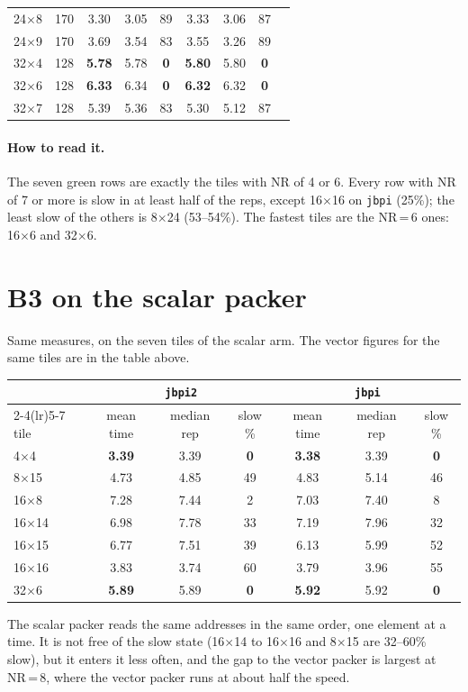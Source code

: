 \documentclass[10pt,a4paper]{article}
\newcommand{\up}[1]{\textcolor{red!70!black}{#1}}
\newcommand{\good}[1]{\textcolor{green!45!black}{\textbf{#1}}}
\begin{document}
\begin{center}
\begin{tabular}{@{}lcccccccc@{}}
24$\times$8 & 170 & 3.30 & 3.05 & \up{89} & 3.33 & 3.06 & \up{87} \\
24$\times$9 & 170 & 3.69 & 3.54 & \up{83} & 3.55 & 3.26 & \up{89} \\
32$\times$4 & 128 & \good{5.78} & 5.78 & \good{0} & \good{5.80} & 5.80 & \good{0} \\
32$\times$6 & 128 & \good{6.33} & 6.34 & \good{0} & \good{6.32} & 6.32 & \good{0} \\
32$\times$7 & 128 & 5.39 & 5.36 & \up{83} & 5.30 & 5.12 & \up{87} \\
\bottomrule
\end{tabular}
\end{center}

\paragraph{How to read it.} The seven green rows are exactly the tiles with NR of 4 or 6. Every row with NR of 7 or
more is slow in at least half of the reps, except 16$\times$16 on \texttt{jbpi} (25\%); the least slow of the others
is 8$\times$24 (53--54\%). The fastest tiles are the NR\,=\,6 ones: 16$\times$6 and 32$\times$6.

\section{B3 on the scalar packer}
Same measures, on the seven tiles of the scalar arm. The vector figures for the same tiles are in the table above.

\begin{center}\footnotesize\setlength{\tabcolsep}{4pt}
\begin{tabular}{@{}lcccccc@{}}
\toprule
 & \multicolumn{3}{c}{\texttt{jbpi2}} & \multicolumn{3}{c}{\texttt{jbpi}} \\
\cmidrule(lr){2-4}\cmidrule(lr){5-7}
tile & mean time & median rep & slow \% & mean time & median rep & slow \% \\
\midrule
4$\times$4 & \good{3.39} & 3.39 & \good{0} & \good{3.38} & 3.39 & \good{0} \\
8$\times$15 & 4.73 & 4.85 & 49 & 4.83 & 5.14 & 46 \\
16$\times$8 & 7.28 & 7.44 & 2 & 7.03 & 7.40 & 8 \\
16$\times$14 & 6.98 & 7.78 & 33 & 7.19 & 7.96 & 32 \\
16$\times$15 & 6.77 & 7.51 & 39 & 6.13 & 5.99 & \up{52} \\
16$\times$16 & 3.83 & 3.74 & \up{60} & 3.79 & 3.96 & \up{55} \\
32$\times$6 & \good{5.89} & 5.89 & \good{0} & \good{5.92} & 5.92 & \good{0} \\
\bottomrule
\end{tabular}
\end{center}
The scalar packer reads the same addresses in the same order, one element at a time. It is not free of the slow
state (16$\times$14 to 16$\times$16 and 8$\times$15 are 32--60\% slow), but it enters it less often, and the gap to
the vector packer is largest at NR\,=\,8, where the vector packer runs at about half the speed.
\end{document}
